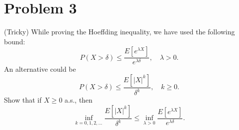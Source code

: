 \section*{Problem 3}
\begin{myanswerbox}
(Tricky) While proving the Hoeffding inequality, we have used the following bound:
\[ P(X > \delta) \leq \frac{E[e^{\lambda X}]}{e^{\lambda \delta}}, \quad \lambda > 0. \]
An alternative could be
\[ P(X > \delta) \leq \frac{E[|X|^k]}{\delta^k}, \quad k \geq 0. \]
Show that if \( X \geq 0 \) a.s., then
\[ \inf_{k=0,1,2,\ldots} \frac{E[|X|^k]}{\delta^k} \leq \inf_{\lambda>0} \frac{E[e^{\lambda X}]}{e^{\lambda \delta}}. \]
\end{myanswerbox}

